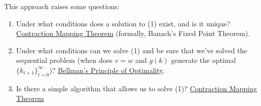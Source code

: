 \documentclass[10pt]{article}
\begin{document}
This approach raises some questions:
\begin{enumerate}
	\item Under what conditions does a solution to (1) exist, and is it unique? \href{https://en.wikipedia.org/wiki/Banach_fixed-point_theorem}{Contraction Mapping Theorem} (formally, Banach's Fixed Point Theorem).
	\item Under what conditions can we solve (1) and be sure that we've solved the sequential problem (\ie when does $v = w$ and $g(k)$ generate the optimal $\{k_{t+1}\}_{t=0}^\infty$)? \href{https://en.wikipedia.org/wiki/Bellman_equation#Bellman's_principle_of_optimality}{Bellman's Principle of Optimality}.
	\item Is there a simple algorithm that allows us to solve (1)? \href{https://en.wikipedia.org/wiki/Banach_fixed-point_theorem}{Contraction Mapping Theorem}
\end{enumerate}
\end{document}
